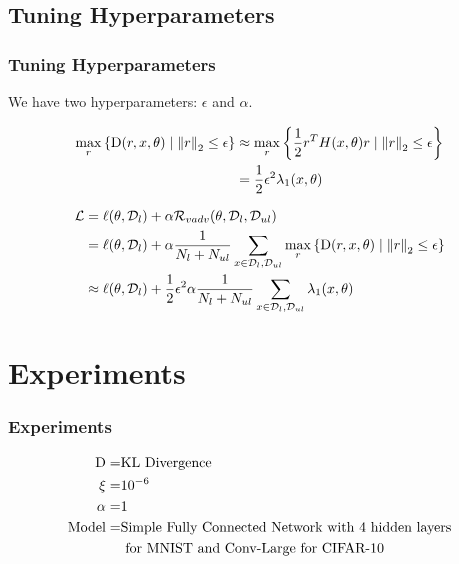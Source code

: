 \subsection{Tuning Hyperparameters}
\begin{frame}
    \frametitle{Tuning Hyperparameters}

We have two hyperparameters: \(\epsilon\) and \(\alpha\).

\begin{align*}
\max_r\left\{ \operatorname*{D}(r, x, \theta) \mid \left\lVert r\right\rVert_2 \le \epsilon\right\} & \approx \max_r\left\{\frac{1}{2} r^T H(x, \theta)r \mid \left\lVert r\right\rVert_2 \le \epsilon\right\}\\
& = \frac{1}{2} \epsilon^2 \lambda_1(x, \theta)
\end{align*}
    
\pause
\begin{align*}
\mathcal{L} &= \ell(\theta, \mathcal{D}_l) + \alpha \mathcal{R}_{vadv} (\theta, \mathcal{D}_l, \mathcal{D}_{ul})\\
&= \ell(\theta, \mathcal{D}_l) + \alpha \frac{1}{N_l + N_{ul}} \sum_{x \in \mathcal{D}_l, \mathcal{D}_{ul}} \max_r\left\{ \operatorname*{D}(r, x, \theta) \mid \left\lVert r\right\rVert_2 \le \epsilon\right\}\\
& \approx \ell(\theta, \mathcal{D}_l) + \frac{1}{2} \epsilon^2\alpha \frac{1}{N_l + N_{ul}} \sum_{x \in \mathcal{D}_l, \mathcal{D}_{ul}}  \lambda_1(x, \theta)
\end{align*}

\end{frame}

\section{Experiments}

\begin{frame}
    \frametitle{Experiments}
\begin{align*}
\operatorname*{D} =& \text{KL Divergence}\\
\xi =& 10^{-6}\\
\alpha =& 1\\
\text{Model} =& \text{Simple Fully Connected Network with 4 hidden layers}\\&\text{ for MNIST and Conv-Large for CIFAR-10}
\end{align*}
\end{frame}

